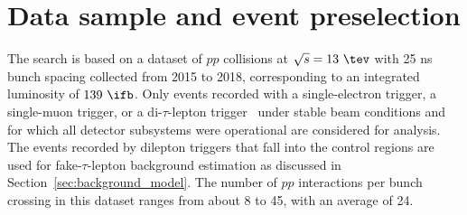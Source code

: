 \section{Data sample and event preselection}
\label{sec:data_presel}

The search is based on a dataset of $pp$ collisions at $\sqrt{s}=13~\tev$ with 25 ns bunch spacing collected from 2015 to 2018, corresponding to an integrated luminosity of $139~\ifb$.
Only events recorded with a single-electron trigger, a single-muon trigger, or a di-$\tau$-lepton trigger~\cite{TRIG-2018-05,TRIG-2018-01,id_trigger,l1topo_trigger} under stable beam conditions 
and for which all detector subsystems were operational are considered for analysis. The events recorded by dilepton triggers that fall into the control regions are used for fake-$\tau$-lepton background
estimation as discussed in Section~\ref{sec:background_model}. The number of $pp$ interactions per bunch crossing in this dataset ranges from about 8 to 45, with an average of 24.

